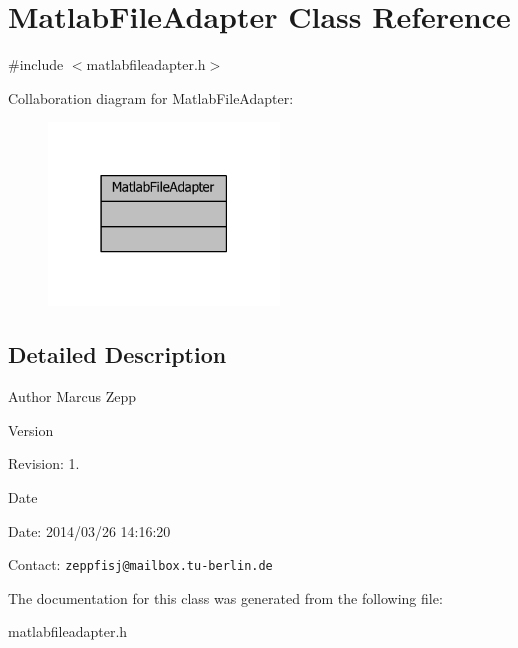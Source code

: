 \section{Matlab\-File\-Adapter Class Reference}
\label{classMatlabFileAdapter}


{\ttfamily \#include $<$matlabfileadapter.\-h$>$}



Collaboration diagram for Matlab\-File\-Adapter\-:
\nopagebreak
\begin{figure}[H]
\begin{center}
\leavevmode
\includegraphics[width=174pt]{d1/d3f/classMatlabFileAdapter__coll__graph}
\end{center}
\end{figure}


\subsection{Detailed Description}
\begin{DoxyAuthor}{Author}
Marcus Zepp
\end{DoxyAuthor}
\begin{DoxyVersion}{Version}

\end{DoxyVersion}
\begin{DoxyParagraph}{Revision\-:}
1. 
\end{DoxyParagraph}


\begin{DoxyDate}{Date}

\end{DoxyDate}
\begin{DoxyParagraph}{Date\-:}
2014/03/26 14\-:16\-:20 
\end{DoxyParagraph}


Contact\-: {\tt zeppfisj@mailbox.\-tu-\/berlin.\-de} 

The documentation for this class was generated from the following file\-:\begin{DoxyCompactItemize}
\item 
matlabfileadapter.\-h\end{DoxyCompactItemize}
